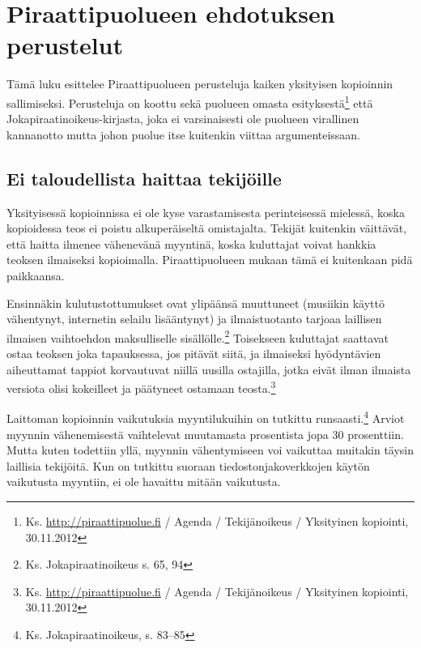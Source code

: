 \documentclass[titlepage,12pt]{article}
\begin{document}



\section{Piraattipuolueen ehdotuksen perustelut}

Tämä luku esittelee Piraattipuolueen perusteluja kaiken yksityisen
kopioinnin sallimiseksi.  Perusteluja on koottu sekä puolueen omasta
esityksestä\footnote{Ks. \url{http://piraattipuolue.fi} / Agenda /
  Tekijänoikeus / Yksityinen kopiointi, 30.11.2012} että
Jokapiraatin\-oikeus-kirjasta, joka ei varsinaisesti ole puolueen
virallinen kannanotto mutta johon puolue itse kuitenkin viittaa
argumenteissaan.

\subsection{Ei taloudellista haittaa tekijöille}

Yksityisessä kopioinnissa ei ole kyse varastamisesta perinteisessä
mielessä, koska kopioidessa teos ei poistu alkuperäiseltä omistajalta.
Tekijät kuitenkin väittävät, että haitta ilmenee vähenevänä myyntinä,
koska kuluttajat voivat hankkia teoksen ilmaiseksi kopioimalla.
Piraattipuolueen mukaan tämä ei kuitenkaan pidä paikkaansa.

Ensinnäkin kulutustottumukset ovat ylipäänsä muuttuneet (musiikin
käyttö vähentynyt, internetin selailu lisääntynyt) ja ilmaistuotanto
tarjoaa laillisen ilmaisen vaihtoehdon maksulliselle
sisällölle.\footnote{Ks. Jokapiraatinoikeus s. 65, 94} Toisekseen
kuluttajat saattavat ostaa teoksen joka tapauksessa, jos pitävät
siitä, ja ilmaiseksi hyödyntävien aiheuttamat tappiot korvautuvat
niillä uusilla ostajilla, jotka eivät ilman ilmaista versiota olisi
kokeilleet ja päätyneet ostamaan
teosta.\footnote{Ks. \url{http://piraattipuolue.fi} / Agenda /
  Tekijänoikeus / Yksityinen kopiointi, 30.11.2012}

Laittoman kopioinnin vaikutuksia myyntilukuihin on tutkittu
runsaasti.\footnote{Ks. Jokapiraatinoikeus, s. 83--85} Arviot
myynnin vähenemisestä vaihtelevat muutamasta prosentista jopa 30
prosenttiin.  Mutta kuten todettiin yllä, myynnin vähentymiseen voi
vaikuttaa muitakin täysin laillisia tekijöitä.  Kun on tutkittu
suoraan tiedostonjakoverkkojen käytön vaikutusta myyntiin, ei ole
havaittu mitään vaikutusta.%
\end{document}
